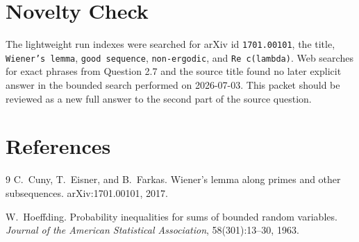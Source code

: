 \documentclass[11pt]{article}
\begin{document}
\section*{Novelty Check}

The lightweight run indexes were searched for arXiv id \texttt{1701.00101}, the title, \texttt{Wiener's lemma}, \texttt{good sequence}, \texttt{non-ergodic}, and \texttt{Re c(lambda)}.  Web searches for exact phrases from Question 2.7 and the source title found no later explicit answer in the bounded search performed on 2026-07-03.  This packet should be reviewed as a new full answer to the second part of the source question.

\section*{References}

\begin{thebibliography}{9}
C.~Cuny, T.~Eisner, and B.~Farkas.
\newblock Wiener's lemma along primes and other subsequences.
\newblock arXiv:1701.00101, 2017.

W.~Hoeffding.
\newblock Probability inequalities for sums of bounded random variables.
\newblock \emph{Journal of the American Statistical Association}, 58(301):13--30, 1963.
\end{thebibliography}
\end{document}
